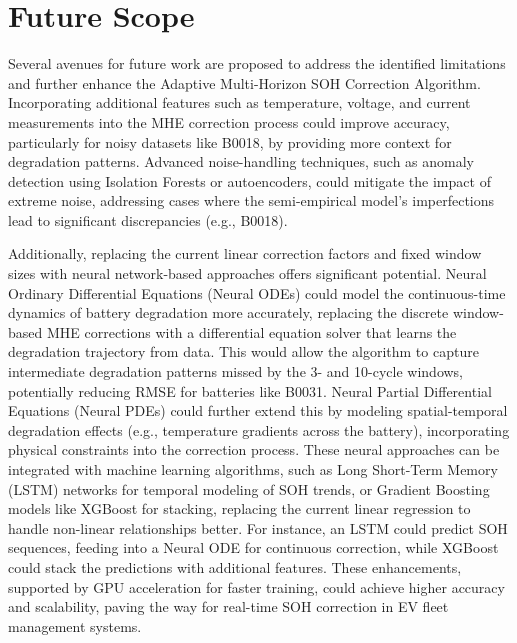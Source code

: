 \section{Future Scope}
Several avenues for future work are proposed to address the identified limitations and further enhance the Adaptive Multi-Horizon SOH Correction Algorithm. Incorporating additional features such as temperature, voltage, and current measurements into the MHE correction process could improve accuracy, particularly for noisy datasets like B0018, by providing more context for degradation patterns. Advanced noise-handling techniques, such as anomaly detection using Isolation Forests or autoencoders, could mitigate the impact of extreme noise, addressing cases where the semi-empirical model’s imperfections lead to significant discrepancies (e.g., B0018).

Additionally, replacing the current linear correction factors and fixed window sizes with neural network-based approaches offers significant potential. Neural Ordinary Differential Equations (Neural ODEs) could model the continuous-time dynamics of battery degradation more accurately, replacing the discrete window-based MHE corrections with a differential equation solver that learns the degradation trajectory from data. This would allow the algorithm to capture intermediate degradation patterns missed by the 3- and 10-cycle windows, potentially reducing RMSE for batteries like B0031. Neural Partial Differential Equations (Neural PDEs) could further extend this by modeling spatial-temporal degradation effects (e.g., temperature gradients across the battery), incorporating physical constraints into the correction process. These neural approaches can be integrated with machine learning algorithms, such as Long Short-Term Memory (LSTM) networks for temporal modeling of SOH trends, or Gradient Boosting models like XGBoost for stacking, replacing the current linear regression to handle non-linear relationships better. For instance, an LSTM could predict SOH sequences, feeding into a Neural ODE for continuous correction, while XGBoost could stack the predictions with additional features. These enhancements, supported by GPU acceleration for faster training, could achieve higher accuracy and scalability, paving the way for real-time SOH correction in EV fleet management systems.